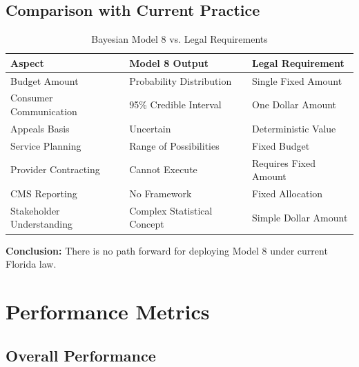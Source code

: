 \subsection{Comparison with Current Practice}

\begin{table}[h]
\centering
\caption{Bayesian Model 8 vs. Legal Requirements}
\begin{tabular}{lll}
\toprule
\textbf{Aspect} & \textbf{Model 8 Output} & \textbf{Legal Requirement} \\
\midrule
Budget Amount & Probability Distribution & Single Fixed Amount \\
Consumer Communication & 95\% Credible Interval & One Dollar Amount \\
Appeals Basis & Uncertain & Deterministic Value \\
Service Planning & Range of Possibilities & Fixed Budget \\
Provider Contracting & Cannot Execute & Requires Fixed Amount \\
CMS Reporting & No Framework & Fixed Allocation \\
Stakeholder Understanding & Complex Statistical Concept & Simple Dollar Amount \\
\bottomrule
\end{tabular}
\end{table}

\textbf{Conclusion:} There is no path forward for deploying Model 8 under current Florida law.


\section{Performance Metrics}

\subsection{Overall Performance}

